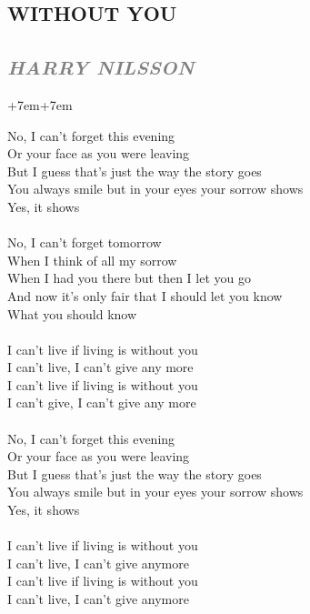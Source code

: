 \documentclass[100pt,a4paper]{report}
\newenvironment{song1}[3]
	{
			\begin{spacing}{0.6}
				\section*{\LARGE\centering \MakeUppercase{\textbf{{#1}}}}
				\subsection*{\Large\centering \textit{\textcolor{gray}{\MakeUppercase{{#2}}}}}
			\end{spacing}
			\vspace{0.8cm}
			\begin{adjustwidth}{+7em}{+7em}
			\Large
			
	}
	{
		\end{adjustwidth}
		\newpage
    }
\begin{document}
\begin{song1}{Without You}{Harry Nilsson}
\noindent
No, I can't forget this evening\\
Or your face as you were leaving\\
But I guess that's just the way the story goes\\
You always smile but in your eyes your sorrow shows\\
Yes, it shows\\
\\
No, I can't forget tomorrow\\
When I think of all my sorrow\\
When I had you there but then I let you go\\
And now it's only fair that I should let you know\\
What you should know\\
\\
I can't live if living is without you\\
I can't live, I can't give any more\\
I can't live if living is without you\\
I can't give, I can't give any more\\
\\
No, I can't forget this evening\\
Or your face as you were leaving\\
But I guess that's just the way the story goes\\
You always smile but in your eyes your sorrow shows\\
Yes, it shows\\
\\
I can't live if living is without you\\
I can't live, I can't give anymore\\
I can't live if living is without you\\
I can't live, I can't give anymore 
\end{song1}
\end{document}

